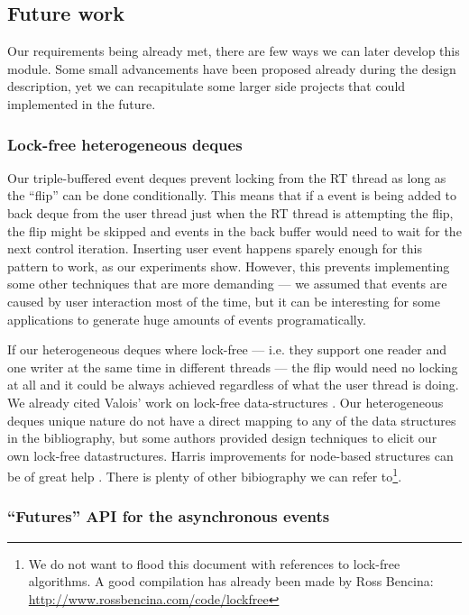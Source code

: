 \subsection{Future work}

Our requirements being already met, there are few ways we can later
develop this module. Some small advancements have been proposed
already during the design description, yet we can recapitulate some
larger side projects that could implemented in the future.

\subsubsection{Lock-free heterogeneous deques}
\label{sec:improvehetero}

Our triple-buffered event deques
prevent locking from the RT thread as long as the ``flip'' can be done
conditionally. This means that if a event is being added to back deque
from the user thread just when the RT thread is attempting the flip,
the flip might be skipped and events in the back buffer would need to
wait for the next control iteration. Inserting user event happens
sparely enough for this pattern to work, as our experiments
show. However, this prevents implementing some other techniques that
are more demanding --- we assumed that events are caused by user
interaction most of the time, but it can be interesting for some
applications to generate huge amounts of events programatically.

If our
heterogeneous deques where lock-free --- i.e. they support one reader
and one writer at the same time in different threads --- the flip
would need no locking at all and it could be always achieved
regardless of what the user thread is doing. We already cited Valois'
work on lock-free data-structures \cite{valois96lockfree,
  michael95correction}. Our heterogeneous deques unique nature do not
have a direct mapping to any of the data structures in the
bibliography, but some authors provided design techniques to elicit
our own lock-free datastructures. Harris improvements for node-based
structures can be of great help \cite{harris01pragmatic}. There is
plenty of other bibiography we can refer to\footnote{We do not want to
  flood this document with references to lock-free algorithms. A good
  compilation has already been made by Ross Bencina:
  \url{http://www.rossbencina.com/code/lockfree}}.

\subsubsection{``Futures'' API for the asynchronous events}

